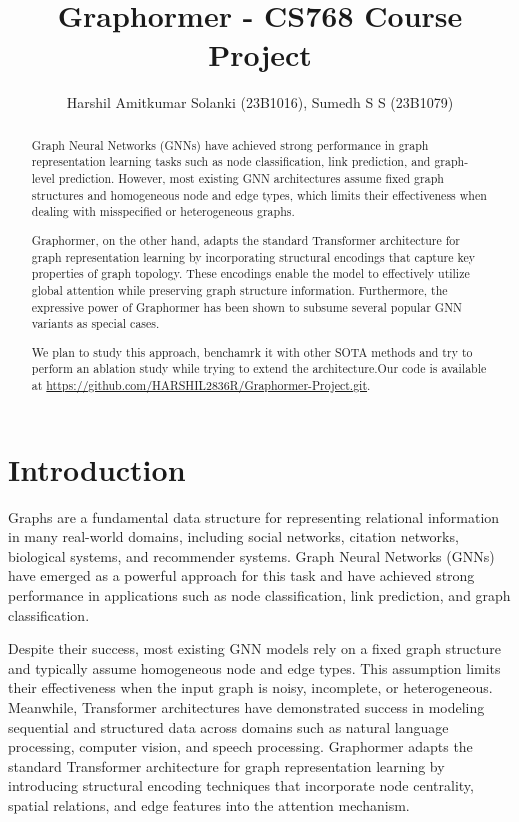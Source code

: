 \documentclass[11pt]{article}
\title{\textbf{Graphormer - CS768 Course Project}}
\author{
Harshil Amitkumar Solanki (23B1016),  Sumedh S S (23B1079) \\
}
\date{}
\begin{document}
\maketitle


\begin{abstract}
Graph Neural Networks (GNNs) have achieved strong performance in graph
representation learning tasks such as node classification, link prediction,
and graph-level prediction. However, most existing GNN architectures assume
fixed graph structures and homogeneous node and edge types, which limits
their effectiveness when dealing with misspecified or heterogeneous graphs.

Graphormer\cite{graphormer}, on the other hand, adapts the standard Transformer architecture
for graph representation learning by incorporating structural encodings
that capture key properties of graph topology. These encodings enable the
model to effectively utilize global attention while preserving graph
structure information. Furthermore, the expressive power of Graphormer has
been shown to subsume several popular GNN variants as special cases.

We plan to study this approach, benchamrk it with other SOTA methods and try to perform an ablation study while trying to extend the architecture.Our code is available at \url{https://github.com/HARSHIL2836R/Graphormer-Project.git}.
\end{abstract}

\section{Introduction}

Graphs are a fundamental data structure for representing relational information
in many real-world domains, including social networks, citation networks,
biological systems, and recommender systems. Graph Neural Networks (GNNs) have emerged as a powerful
approach for this task and have achieved strong performance in applications
such as node classification, link prediction, and graph classification.

Despite their success, most existing GNN models rely on a fixed graph structure
and typically assume homogeneous node and edge types. This assumption limits
their effectiveness when the input graph is noisy, incomplete, or heterogeneous.
Meanwhile, Transformer architectures have demonstrated  success in
modeling sequential and structured data across domains such as natural language
processing, computer vision, and speech processing.
Graphormer adapts the
standard Transformer architecture for graph representation learning by
introducing structural encoding techniques that incorporate node centrality,
spatial relations, and edge features into the attention mechanism.
\end{document}
